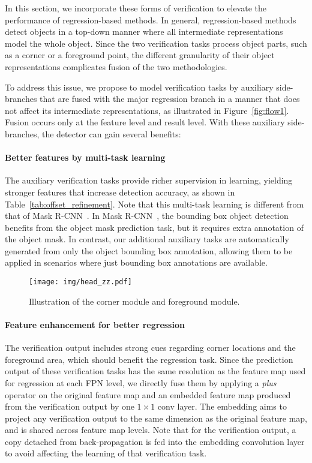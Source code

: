 \documentclass{article}
\begin{document}
In this section, we incorporate these forms of verification to elevate the performance of regression-based methods. In general, regression-based methods detect objects in a top-down manner where all intermediate representations model the whole object. Since the two verification tasks process object parts, such as a corner or a foreground point, the different granularity of their object representations complicates fusion of the two methodologies.

To address this issue, we propose to model verification tasks by auxiliary side-branches that are fused with the major regression branch in a manner that does not affect its intermediate representations, as illustrated in Figure~\ref{fig:flow1}. Fusion occurs only at the feature level and result level. With these auxiliary side-branches, the detector can gain several benefits:

\paragraph{Better features by multi-task learning} The auxiliary verification tasks provide richer supervision in learning, yielding stronger features that increase detection accuracy, as shown in Table~\ref{tab:offset_refinement}. Note that this multi-task learning is different from that of Mask R-CNN~\cite{Mask-rcnn}. In Mask R-CNN~\cite{Mask-rcnn}, the bounding box object detection benefits from the object mask prediction task, but it requires extra annotation of the object mask. In contrast, our additional auxiliary tasks are automatically generated from only the object bounding box annotation, allowing them to be applied in scenarios where just bounding box annotations are available.

\begin{wrapfigure}{r}{0.45\textwidth}
  \begin{center}
    \texttt{[image: img/head\_zz.pdf]}
  \end{center}
  \vspace{-1.5em}
  \caption{Illustration of the corner module and foreground module. }
  \label{fig:head}
  \vspace{-1em}
\end{wrapfigure}

\paragraph{Feature enhancement for better regression} The verification output includes strong cues regarding corner locations and the foreground area, which should benefit the regression task. Since the prediction output of these verification tasks has the same resolution as the feature map used for regression at each FPN level, we directly fuse them by applying a \emph{plus} operator on the original feature map and an embedded feature map produced from the verification output by one $1\times1$ conv layer. The embedding aims to project any verification output to the same dimension as the original feature map, and is shared across feature map levels. Note that for the verification output, a copy detached from back-propagation is fed into the embedding convolution layer to avoid affecting the learning of that verification task.
\end{document}
